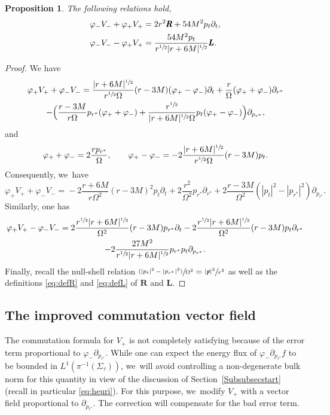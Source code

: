 \documentclass[JEP,XML,SOM,Unicode,published]{cedram}
\newcommand{\psfrac}[2]{\sfrac{(#1)}{#2}}
\theoremstyle{plain}
\newtheorem{proposition}{Proposition}[section]
\theoremstyle{definition}
\begin{document}
\begin{proposition}\label{ProvarphiV}
The following relations hold,
\begin{align*}
\varphi_-V_-+\varphi_+ V_+ &= 2r^2 \pmb{R} +54M^2p_t\partial_t, \\
\varphi_-V_--\varphi_+ V_+ &= \frac{54M^2p_t}{r^{\sfrac{1}{2}}|r+6M|^{\sfrac{1}{2}}} \pmb{L}.
\end{align*}
\end{proposition}
\begin{proof}
We have
\begin{multline*}
\varphi_+ V_++\varphi_-V_- = \frac{|r+6M|^{\sfrac{1}{2}}}{r^{\sfrac{1}{2}}\Omega}(r-3M)(\varphi_+-\varphi_-) \partial_t+\frac{r}{\Omega} (\varphi_++\varphi_-)\partial_{r^*} \\
-\Bigl(\frac{r-3M}{r\Omega}p_{r^*}(\varphi_++\varphi_-)+\frac{r^{\sfrac{1}{2}}}{|r+6M|^{\sfrac{1}{2}} \Omega}p_t (\varphi_+-\varphi_-) \Bigr) \partial_{p_{r^*}},
\end{multline*}
and
\[
\varphi_++\varphi_-= 2\frac{r p_{r^*}}{\Omega}, \qquad \varphi_+-\varphi_-=-2\frac{|r+6M|^{\sfrac{1}{2}}}{r^{\sfrac{1}{2}}\Omega}(r-3M)p_t.
\]
Consequently, we~have
\[
\varphi_+ V_+\!+\!\varphi_-V_- \!=\! -2\frac{r+6M}{r\Omega^2}(r-3M)^2p_t \partial_t\!+\!2\frac{r^2}{\Omega^2} p_{r^*}\partial_{r^*}
\!+\!2\frac{r-3M}{ \Omega^2}(|p_t|^2-|p_{r^*}|^2) \partial_{p_{r^*}}.
\]
Similarly, one has
\begin{multline*} \varphi_+ V_+-\varphi_-V_- = 2\frac{r^{\sfrac{1}{2}}|r+6M|^{\sfrac{1}{2}}}{\Omega^2}(r-3M)p_{r^*} \partial_t -2\frac{r^{\sfrac{1}{2}}|r+6M|^{\sfrac{1}{2}}}{\Omega^2}(r-3M) p_t\partial_{r^*} \\
-2\frac{27M^2}{r^{\sfrac{1}{2}}|r+6M|^{\sfrac{1}{2}}}p_{r^*}p_t \partial_{p_{r^*}}.
\end{multline*}
Finally, recall the null-shell relation $\psfrac{|p_t|^2-|p_{r^*}|^2}{\Omega^2}=\sfrac{|\slashed{p}|^2}{r^2} $ as well as the definitions \eqref{eq:defR} and \eqref{eq:defL} of $\pmb{R}$ and $\pmb{L}$.
\end{proof}

\subsection{The improved commutation vector field}

The commutation formula for $V_+$ is not completely satisfying because of the error term proportional to $\varphi_- \partial_{p_{r^*}}$. While one can expect the energy flux of $\varphi_- \partial_{p_{r^*}} f$ to be bounded in $L^1(\pi^{-1}(\Sigma_\tau))$, we~will avoid controlling a non-degenerate bulk norm for this quantity in view of the discussion of Section~\ref{Subsubsecstart} (recall in particular \eqref{eq:heuri}). For this purpose, we~modify $V_+$ with a vector field proportional to $\partial_{p_{r^*}}$. The correction will compensate for the bad error term.
\end{document}
